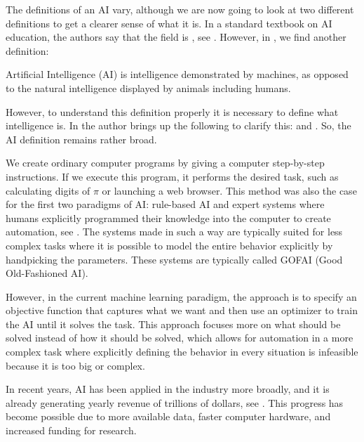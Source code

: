 \documentclass[12pt,A4]{report}
\theoremstyle{definition}
\begin{document}
The definitions of an AI vary, although we are now going to look at two different definitions to get a clearer sense of what it is. In a standard textbook on AI education, the authors say that the field is , see \citet[p.19]{RussellNorvig}. However, in \citet{Wiki}, we find another definition: 
\begin{displayquote}
Artificial Intelligence (AI) is intelligence demonstrated by machines, as opposed to the natural intelligence displayed by animals including humans.
\end{displayquote}
However, to understand this definition properly it is necessary to define what intelligence is. In \citet[p.22]{TankandeMaskiner} the author brings up the following to clarify this:  and . So, the AI definition remains rather broad.


We create ordinary computer programs by giving a computer step-by-step instructions. If we execute this program, it performs the desired task, such as calculating digits of $\pi$ or launching a web browser. This method was also the case for the first two paradigms of AI: rule-based AI and expert systems where humans explicitly programmed their knowledge into the computer to create automation, see \citet[c.1]{Bostrom14}. The systems made in such a way are typically suited for less complex tasks where it is possible to model the entire behavior explicitly by handpicking the parameters. These systems are typically called GOFAI (Good Old-Fashioned AI). 

However, in the current machine learning paradigm, the approach is to specify an objective function that captures what we want and then use an optimizer to train the AI until it solves the task. This approach focuses more on what should be solved instead of how it should be solved, which allows for automation in a more complex task where explicitly defining the behavior in every situation is infeasible because it is too big or complex. 

In recent years, AI has been applied in the industry more broadly, and it is already generating yearly revenue of trillions of dollars, see \citet[p.19]{RussellNorvig}. This progress has become possible due to more available data, faster computer hardware, and increased funding for research. 
\end{document}
